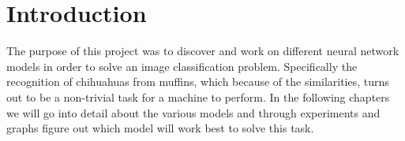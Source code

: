 \chapter{Introduction} \label{ch:introduction}
The purpose of this project was to discover and work on different neural network models in order to solve an image classification problem. Specifically the recognition of chihuahuas from muffins, which because of the similarities, turns out to be a non-trivial task for a machine to perform.
In the following chapters we will go into detail about the various models and through experiments and graphs figure out which model will work best to solve this task.
